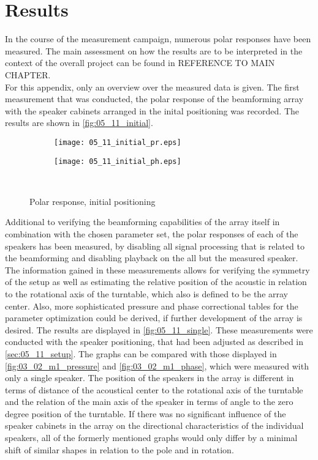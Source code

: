 \section*{Results}\label{sec:05_11_results}
In the course of the measurement campaign, numerous polar responses have been measured. The main assessment on how the results are to be interpreted in the context of the overall project can be found in REFERENCE TO MAIN CHAPTER.\\
For this appendix, only an overview over the measured data is given.
The first measurement that was conducted, the polar response of the beamforming array with the speaker cabinets arranged in the inital positioning was recorded. The results are shown in \autoref{fig:05_11_initial}.
\begin{figure}[h]
\begin{subfigure}[c]{0.5\textwidth}
\texttt{[image: 05\_11\_initial\_pr.eps]}
\label{fig:05_11_init_pr}
\end{subfigure}
\begin{subfigure}[c]{0.5\textwidth}
\texttt{[image: 05\_11\_initial\_ph.eps]}
\label{fig:05_11_init_ph}
\end{subfigure}\\
\caption{Polar response, initial positioning}  
\label{fig:05_11_initial}
\end{figure}
Additional to verifying the beamforming capabilities of the array itself in combination with the chosen parameter set, the polar responses of each of the speakers has been measured, by disabling all signal processing that is related to the beamforming and disabling playback on the all but the measured speaker. The information gained in these measurements allows for verifying the symmetry of the setup as well as estimating the relative position of the acoustic in relation to the rotational axis of the turntable, which also is defined to be the array center. Also, more sophisticated pressure and phase correctional tables for the parameter optimization could be derived, if further development of the array is desired. The results are displayed in \autoref{fig:05_11_single}. These measurements were conducted with the speaker positioning, that had been adjusted as described in \autoref{sec:05_11_setup}.
The graphs can be compared with those displayed in \autoref{fig:03_02_m1_pressure} and \ref{fig:03_02_m1_phase}, which were measured with only a single speaker. The position of the speakers in the array is different in terms of distance of the acoustical center to the rotational axis of the turntable and the relation of the main axis of the speaker in terms of angle to the zero degree position of the turntable. If there was no significant influence of the speaker cabinets in the array on the directional characteristics of the individual speakers, all of the formerly mentioned graphs would only differ by a minimal shift of similar shapes in relation to the pole and in rotation. 
